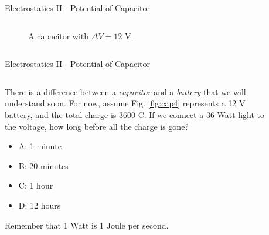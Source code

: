 \documentclass{beamer}
\begin{document}
\begin{frame}{Electrostatics II - Potential of Capacitor}
\begin{columns}[T]
\begin{column}{0.275\textwidth}
\begin{figure}
\caption{\label{fig:cap3} A capacitor with $\Delta V = 12$ V.}
\end{figure}
\end{column}
\end{columns}
\end{frame}

\begin{frame}{Electrostatics II - Potential of Capacitor}
\small
\begin{columns}[T]
\begin{column}{0.5\textwidth}
There is a difference between a \textit{capacitor} and a \textit{battery} that we will understand soon.  For now, assume Fig. \ref{fig:cap4} represents a 12 V battery, and the total charge is 3600 C.  If we connect a 36 Watt light to the voltage, how long before all the charge is gone?
\begin{itemize}
\item A: 1 minute
\item B: 20 minutes
\item C: 1 hour
\item D: 12 hours
\end{itemize}
\footnotesize
Remember that 1 Watt is 1 Joule per second.
\end{column}
\begin{column}{0.275\textwidth}
\begin{figure}

\end{figure}
\end{column}
\end{columns}
\end{frame}
\end{document}
